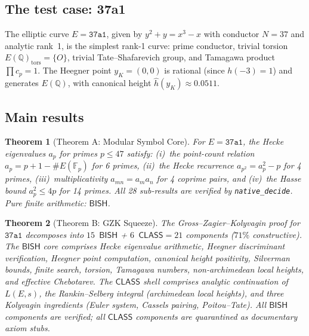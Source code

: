 \documentclass[11pt]{article}
\theoremstyle{plain}
\newtheorem{theorem}{Theorem}[section]
\theoremstyle{definition}
\theoremstyle{remark}
\newcommand{\Q}{\mathbb{Q}}
\newcommand{\F}{\mathbb{F}}
\newcommand{\BISH}{\ensuremath{\mathsf{BISH}}}
\newcommand{\CLASS}{\ensuremath{\mathsf{CLASS}}}
\newcommand{\hhat}{\hat{h}}
\begin{document}
\subsection{The test case: 37a1}

The elliptic curve $E = \texttt{37a1}$, given by $y^2 + y = x^3 - x$ with conductor $N = 37$ and analytic rank~1, is the simplest rank-1 curve: prime conductor, trivial torsion $E(\Q)_{\mathrm{tors}} = \{O\}$, trivial Tate--Shafarevich group, and Tamagawa product $\prod c_p = 1$. The Heegner point $y_K = (0,0)$ is rational (since $h(-3) = 1$) and generates $E(\Q)$, with canonical height $\hhat(y_K) \approx 0.0511$.

\subsection{Main results}

\begin{theorem}[Theorem A: Modular Symbol Core]
\label{thm:A}
For $E = \texttt{37a1}$, the Hecke eigenvalues $a_p$ for primes $p \leq 47$ satisfy: (i)~the point-count relation $a_p = p+1-\#E(\F_p)$ for 6 primes, (ii)~the Hecke recurrence $a_{p^2} = a_p^2 - p$ for 4 primes, (iii)~multiplicativity $a_{mn} = a_m a_n$ for 4 coprime pairs, and (iv)~the Hasse bound $a_p^2 \leq 4p$ for 14 primes. All 28 sub-results are verified by \texttt{native\_decide}. Pure finite arithmetic: $\BISH$.
\end{theorem}

\begin{theorem}[Theorem B: GZK Squeeze]
\label{thm:B}
The Gross--Zagier--Kolyvagin proof for $\texttt{37a1}$ decomposes into $15$~$\BISH$ + $6$~$\CLASS = 21$ components ($71\%$ constructive). The $\BISH$ core comprises Hecke eigenvalue arithmetic, Heegner discriminant verification, Heegner point computation, canonical height positivity, Silverman bounds, finite search, torsion, Tamagawa numbers, non-archimedean local heights, and effective Chebotarev. The $\CLASS$ shell comprises analytic continuation of~$L(E,s)$, the Rankin--Selberg integral (archimedean local heights), and three Kolyvagin ingredients (Euler system, Cassels pairing, Poitou--Tate). All $\BISH$ components are verified; all $\CLASS$ components are quarantined as documentary axiom stubs.
\end{theorem}
\end{document}
